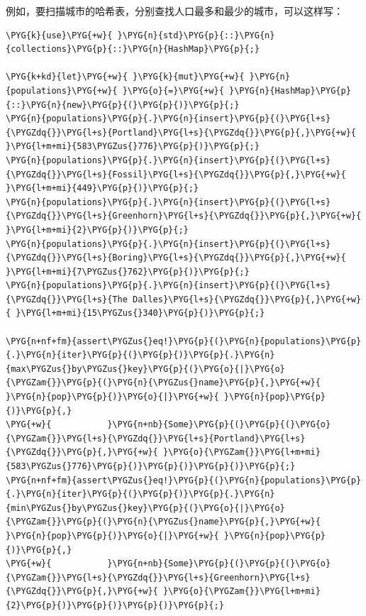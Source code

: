 例如，要扫描城市的哈希表，分别查找人口最多和最少的城市，可以这样写：

\begin{Verbatim}[commandchars=\\\{\},breaklines=true,breakanywhere=true,fontsize=\codefont,xleftmargin=17bp]
\PYG{k}{use}\PYG{+w}{ }\PYG{n}{std}\PYG{p}{::}\PYG{n}{collections}\PYG{p}{::}\PYG{n}{HashMap}\PYG{p}{;}

\PYG{k+kd}{let}\PYG{+w}{ }\PYG{k}{mut}\PYG{+w}{ }\PYG{n}{populations}\PYG{+w}{ }\PYG{o}{=}\PYG{+w}{ }\PYG{n}{HashMap}\PYG{p}{::}\PYG{n}{new}\PYG{p}{(}\PYG{p}{)}\PYG{p}{;}
\PYG{n}{populations}\PYG{p}{.}\PYG{n}{insert}\PYG{p}{(}\PYG{l+s}{\PYGZdq{}}\PYG{l+s}{Portland}\PYG{l+s}{\PYGZdq{}}\PYG{p}{,}\PYG{+w}{  }\PYG{l+m+mi}{583\PYGZus{}776}\PYG{p}{)}\PYG{p}{;}
\PYG{n}{populations}\PYG{p}{.}\PYG{n}{insert}\PYG{p}{(}\PYG{l+s}{\PYGZdq{}}\PYG{l+s}{Fossil}\PYG{l+s}{\PYGZdq{}}\PYG{p}{,}\PYG{+w}{        }\PYG{l+m+mi}{449}\PYG{p}{)}\PYG{p}{;}
\PYG{n}{populations}\PYG{p}{.}\PYG{n}{insert}\PYG{p}{(}\PYG{l+s}{\PYGZdq{}}\PYG{l+s}{Greenhorn}\PYG{l+s}{\PYGZdq{}}\PYG{p}{,}\PYG{+w}{       }\PYG{l+m+mi}{2}\PYG{p}{)}\PYG{p}{;}
\PYG{n}{populations}\PYG{p}{.}\PYG{n}{insert}\PYG{p}{(}\PYG{l+s}{\PYGZdq{}}\PYG{l+s}{Boring}\PYG{l+s}{\PYGZdq{}}\PYG{p}{,}\PYG{+w}{      }\PYG{l+m+mi}{7\PYGZus{}762}\PYG{p}{)}\PYG{p}{;}
\PYG{n}{populations}\PYG{p}{.}\PYG{n}{insert}\PYG{p}{(}\PYG{l+s}{\PYGZdq{}}\PYG{l+s}{The Dalles}\PYG{l+s}{\PYGZdq{}}\PYG{p}{,}\PYG{+w}{ }\PYG{l+m+mi}{15\PYGZus{}340}\PYG{p}{)}\PYG{p}{;}

\PYG{n+nf+fm}{assert\PYGZus{}eq!}\PYG{p}{(}\PYG{n}{populations}\PYG{p}{.}\PYG{n}{iter}\PYG{p}{(}\PYG{p}{)}\PYG{p}{.}\PYG{n}{max\PYGZus{}by\PYGZus{}key}\PYG{p}{(}\PYG{o}{|}\PYG{o}{\PYGZam{}}\PYG{p}{(}\PYG{n}{\PYGZus{}name}\PYG{p}{,}\PYG{+w}{ }\PYG{n}{pop}\PYG{p}{)}\PYG{o}{|}\PYG{+w}{ }\PYG{n}{pop}\PYG{p}{)}\PYG{p}{,}
\PYG{+w}{           }\PYG{n+nb}{Some}\PYG{p}{(}\PYG{p}{(}\PYG{o}{\PYGZam{}}\PYG{l+s}{\PYGZdq{}}\PYG{l+s}{Portland}\PYG{l+s}{\PYGZdq{}}\PYG{p}{,}\PYG{+w}{ }\PYG{o}{\PYGZam{}}\PYG{l+m+mi}{583\PYGZus{}776}\PYG{p}{)}\PYG{p}{)}\PYG{p}{)}\PYG{p}{;}
\PYG{n+nf+fm}{assert\PYGZus{}eq!}\PYG{p}{(}\PYG{n}{populations}\PYG{p}{.}\PYG{n}{iter}\PYG{p}{(}\PYG{p}{)}\PYG{p}{.}\PYG{n}{min\PYGZus{}by\PYGZus{}key}\PYG{p}{(}\PYG{o}{|}\PYG{o}{\PYGZam{}}\PYG{p}{(}\PYG{n}{\PYGZus{}name}\PYG{p}{,}\PYG{+w}{ }\PYG{n}{pop}\PYG{p}{)}\PYG{o}{|}\PYG{+w}{ }\PYG{n}{pop}\PYG{p}{)}\PYG{p}{,}
\PYG{+w}{           }\PYG{n+nb}{Some}\PYG{p}{(}\PYG{p}{(}\PYG{o}{\PYGZam{}}\PYG{l+s}{\PYGZdq{}}\PYG{l+s}{Greenhorn}\PYG{l+s}{\PYGZdq{}}\PYG{p}{,}\PYG{+w}{ }\PYG{o}{\PYGZam{}}\PYG{l+m+mi}{2}\PYG{p}{)}\PYG{p}{)}\PYG{p}{)}\PYG{p}{;}
\end{Verbatim}

